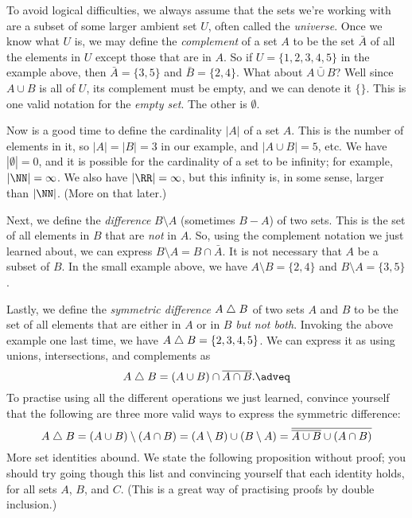 To avoid logical difficulties, we always assume that the sets we're working with are a subset of some
larger ambient set $U$, often called the {\it universe}.
Once we know what $U$ is, we may define the {\it complement}
of a set $A$ to be the set $\bar A$ of all the elements in $U$ except those that are in $A$.
So if $U = \{1,2,3,4,5\}$ in the example above, then $\bar A = \{3,5\}$ and $\bar B = \{2,4\}$.
What about $\bar{A\cup B}$? Well since $A\cup B$ is all of $U$, its complement must be empty, and we can denote
it $\{\}$. This is one valid notation for the {\it empty set}. The other is $\emptyset$.

Now is a good time to define the cardinality $|A|$ of a set $A$.
This is the number of elements in it, so $|A| = |B| = 3$
in our example, and $|A\cup B| = 5$, etc. We have $|\emptyset| = 0$, and it is possible for the cardinality of
a set to be infinity; for example, $|\NN| = \infty$. We also have $|\RR| = \infty$, but this infinity
is, in some sense, larger than $|\NN|$. (More on that later.)

Next, we define the {\it difference} $B\setminus A$ (sometimes $B-A$) of two sets.
This is the set of all elements
in $B$ that are {\it not} in $A$. So, using the complement notation we just learned about,
we can express $B\setminus A = B \cap \bar A$. It is not necessary that $A$ be a subset of $B$. In
the small example above, we have $A\setminus B = \{2,4\}$ and $B\setminus A = \{3,5\}$.

Lastly, we define the {\it symmetric difference} $A \mathrel{\triangle} B$ of two sets $A$ and $B$ to be the set of all
elements that are either in $A$ or in $B$ {\it but not both}.
Invoking the above example one last time, we
have $A\mathrel{\triangle} B = \{2,3,4,5\}$.
We can express it as using unions, intersections,
and complements as
\edef\eqsymdiffdef{\the\eqcount}
$$A \symdiff B = (A\cup B) \cap \bar{A \cap B}.\adveq$$
To practise using all the different operations we just learned,
convince yourself that the following are three more valid ways to express the symmetric difference:
$$A\mathrel{\triangle} B = (A\cup B)\setminus (A\cap B) = (A\setminus B) \cup (B\setminus A) =
\overline{\overline{A\cup B} \cup (A\cap B)}$$
More set identities abound. We state the following proposition without proof; you should try going
though this list and convincing yourself that each identity holds, for all sets $A$, $B$, and $C$.
(This is a great way of practising proofs by double inclusion.)

